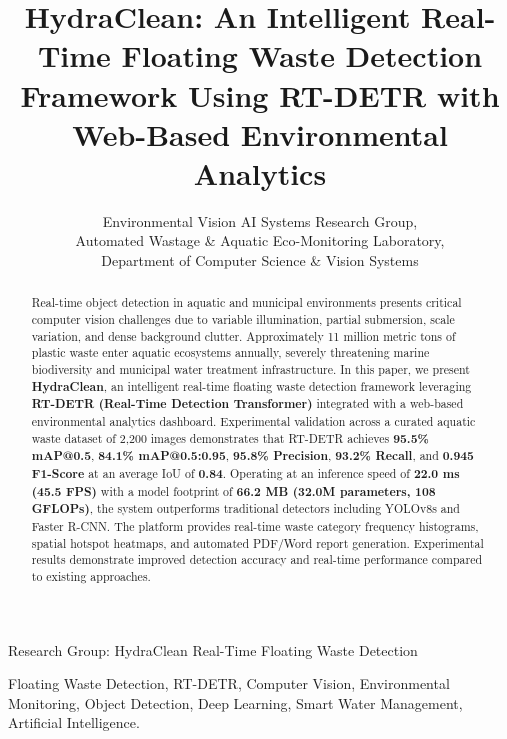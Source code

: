 \documentclass[10pt,journal,compsoc]{IEEEtran}
\begin{document}
\title{HydraClean: An Intelligent Real-Time Floating Waste Detection Framework Using RT-DETR with Web-Based Environmental Analytics}

\author{Environmental Vision AI Systems Research Group, \\
Automated Wastage \& Aquatic Eco-Monitoring Laboratory, \\
Department of Computer Science \& Vision Systems}

%
{Research Group: HydraClean Real-Time Floating Waste Detection}

\maketitle

\begin{abstract}
Real-time object detection in aquatic and municipal environments presents critical computer vision challenges due to variable illumination, partial submersion, scale variation, and dense background clutter. Approximately 11 million metric tons of plastic waste enter aquatic ecosystems annually, severely threatening marine biodiversity and municipal water treatment infrastructure. In this paper, we present \textbf{HydraClean}, an intelligent real-time floating waste detection framework leveraging \textbf{RT-DETR (Real-Time Detection Transformer)} integrated with a web-based environmental analytics dashboard. Experimental validation across a curated aquatic waste dataset of 2,200 images demonstrates that RT-DETR achieves \textbf{95.5\% mAP@0.5}, \textbf{84.1\% mAP@0.5:0.95}, \textbf{95.8\% Precision}, \textbf{93.2\% Recall}, and \textbf{0.945 F1-Score} at an average IoU of \textbf{0.84}. Operating at an inference speed of \textbf{22.0 ms (45.5 FPS)} with a model footprint of \textbf{66.2 MB (32.0M parameters, 108 GFLOPs)}, the system outperforms traditional detectors including YOLOv8s and Faster R-CNN. The platform provides real-time waste category frequency histograms, spatial hotspot heatmaps, and automated PDF/Word report generation. Experimental results demonstrate improved detection accuracy and real-time performance compared to existing approaches.
\end{abstract}

\begin{IEEEkeywords}
Floating Waste Detection, RT-DETR, Computer Vision, Environmental Monitoring, Object Detection, Deep Learning, Smart Water Management, Artificial Intelligence.
\end{IEEEkeywords}
\end{document}
